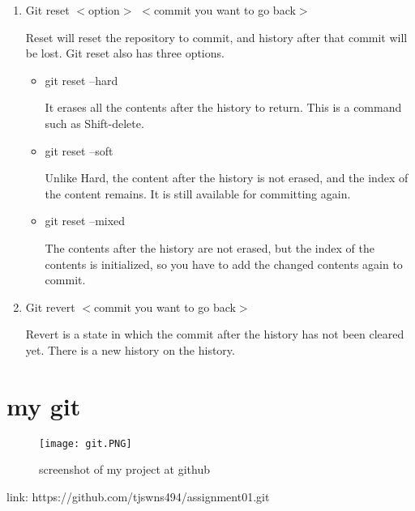 \documentclass[a4paper]{article}
\begin{document}
\begin{enumerate}
\item Git reset $<$option$>$ $<$commit you want to go back$>$

Reset will reset the repository to commit, and history after that commit will be lost. Git reset also has three options.

\begin{itemize}
\item git reset --hard

It erases all the contents after the history to return. This is a command such as Shift-delete.
\end{itemize}
\begin{itemize}
\item git reset --soft

Unlike Hard, the content after the history is not erased, and the index of the content remains. It is still available for committing again.
\end{itemize}
\begin{itemize}
\item git reset --mixed

The contents after the history are not erased, but the index of the contents is initialized, so you have to add the changed contents again to commit.
\end{itemize}

\item Git revert $<$commit you want to go back$>$

Revert is a state in which the commit after the history has not been cleared yet. There is a new history on the history.
\end{enumerate}

\section{my git}
\begin{figure}[!htbp]
\begin{center}
\texttt{[image: git.PNG]}
\end{center}
\caption{screenshot of my project at github}\label{exampleplot}
\end{figure}

link: https://github.com/tjswns494/assignment01.git
\end{document}
